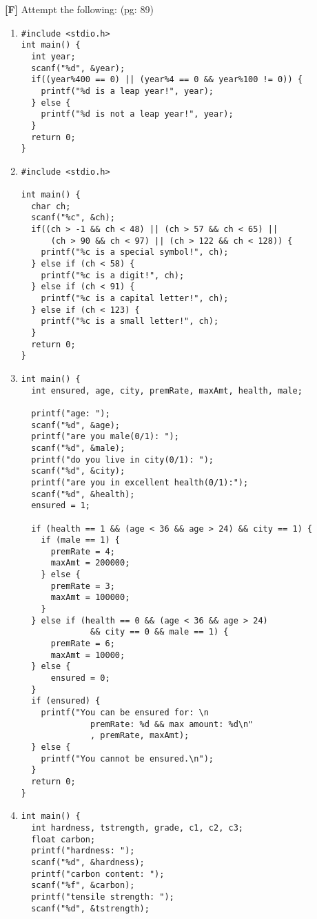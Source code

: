 \documentclass{report}
\begin{document}
\textbf{[F]} Attempt the following: (pg: 89)
\begin{enumerate}
    \renewcommand{\labelenumi}{\alph{enumi}}
  \item \begin{verbatim}
#include <stdio.h>
int main() {
  int year;
  scanf("%d", &year);
  if((year%400 == 0) || (year%4 == 0 && year%100 != 0)) {
    printf("%d is a leap year!", year);
  } else {
    printf("%d is not a leap year!", year);
  }
  return 0;
}
  \end{verbatim}
\item \begin{verbatim}
#include <stdio.h>

int main() {
  char ch;
  scanf("%c", &ch);
  if((ch > -1 && ch < 48) || (ch > 57 && ch < 65) || 
      (ch > 90 && ch < 97) || (ch > 122 && ch < 128)) {
    printf("%c is a special symbol!", ch);
  } else if (ch < 58) {
    printf("%c is a digit!", ch);
  } else if (ch < 91) {
    printf("%c is a capital letter!", ch);
  } else if (ch < 123) {
    printf("%c is a small letter!", ch);
  }
  return 0;
}
  \end{verbatim}
\item \begin{verbatim}
int main() {
  int ensured, age, city, premRate, maxAmt, health, male;

  printf("age: ");
  scanf("%d", &age);
  printf("are you male(0/1): ");
  scanf("%d", &male);
  printf("do you live in city(0/1): ");
  scanf("%d", &city);
  printf("are you in excellent health(0/1):");
  scanf("%d", &health);
  ensured = 1;

  if (health == 1 && (age < 36 && age > 24) && city == 1) {
    if (male == 1) {
      premRate = 4;
      maxAmt = 200000;
    } else {
      premRate = 3;
      maxAmt = 100000;
    }
  } else if (health == 0 && (age < 36 && age > 24) 
              && city == 0 && male == 1) {
      premRate = 6;
      maxAmt = 10000;
  } else {
      ensured = 0;
  }
  if (ensured) {
    printf("You can be ensured for: \n
              premRate: %d && max amount: %d\n"
              , premRate, maxAmt);
  } else {
    printf("You cannot be ensured.\n");
  }
  return 0;
}
  \end{verbatim}
\item \begin{verbatim}
int main() {
  int hardness, tstrength, grade, c1, c2, c3;
  float carbon;
  printf("hardness: ");
  scanf("%d", &hardness);
  printf("carbon content: ");
  scanf("%f", &carbon);
  printf("tensile strength: ");
  scanf("%d", &tstrength);


\end{verbatim}
\end{enumerate}
\end{document}
